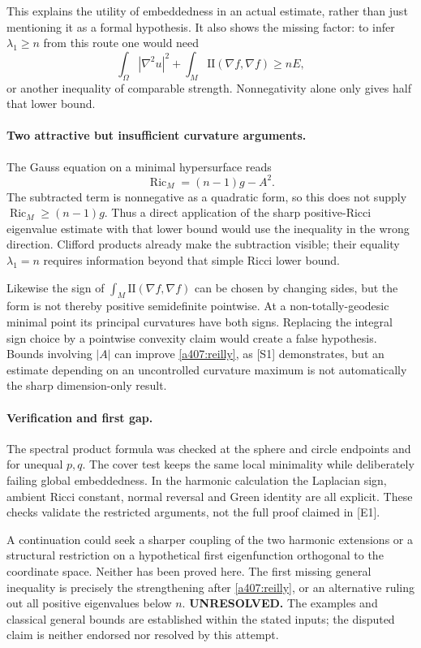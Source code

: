 \documentclass[11pt]{article}
\begin{document}
This explains the utility of embeddedness in an actual estimate,
rather than just mentioning it as a formal hypothesis. It also
shows the missing factor: to infer $\lambda_1\geq n$ from this
route one would need
\[
 \int_\Omega|\nabla^2u|^2+
 \int_M\mathrm{II}(\nabla f,\nabla f)\geq nE,
\]
or another inequality of comparable strength. Nonnegativity alone
only gives half that lower bound.

\paragraph{Two attractive but insufficient curvature arguments.}
The Gauss equation on a minimal hypersurface reads
\[
 \operatorname{Ric}_M=(n-1)g-A^2.
\]
The subtracted term is nonnegative as a quadratic form, so this
does not supply $\operatorname{Ric}_M\geq(n-1)g$.
Thus a direct application of the sharp positive-Ricci
eigenvalue estimate with that lower bound would use the
inequality in the wrong direction. Clifford products already
make the subtraction visible; their equality $\lambda_1=n$
requires information beyond that simple Ricci lower bound.

Likewise the sign of
$\int_M\mathrm{II}(\nabla f,\nabla f)$ can be chosen by changing
sides, but the form is not thereby positive semidefinite
pointwise. At a non-totally-geodesic minimal point its
principal curvatures have both signs. Replacing the integral
sign choice by a pointwise convexity claim would create a
false hypothesis. Bounds involving $|A|$ can improve
\eqref{a407:reilly}, as [S1] demonstrates, but an estimate
depending on an uncontrolled curvature maximum is not
automatically the sharp dimension-only result.

\paragraph{Verification and first gap.}
The spectral product formula was checked at the sphere and
circle endpoints and for unequal $p,q$. The cover test keeps
the same local minimality while deliberately failing global
embeddedness. In the harmonic calculation the Laplacian sign,
ambient Ricci constant, normal reversal and Green identity
are all explicit. These checks validate the restricted
arguments, not the full proof claimed in [E1].

A continuation could seek a sharper coupling of the two
harmonic extensions or a structural restriction on a
hypothetical first eigenfunction orthogonal to the coordinate
space. Neither has been proved here. The first missing
general inequality is precisely the strengthening after
\eqref{a407:reilly}, or an alternative ruling out all positive
eigenvalues below $n$.
\textbf{UNRESOLVED.} The examples and classical general bounds
are established within the stated inputs; the disputed
claim is neither endorsed nor resolved by this attempt.
\end{document}
